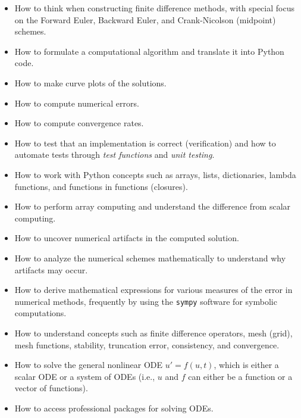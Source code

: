 \documentclass[graybox,sectrefs,envcountresetchap,open=right,final]{svmonodo}
\begin{document}
\begin{itemize}
 \item How to think when constructing finite difference methods, with special focus
   on the Forward Euler, Backward Euler, and Crank-Nicolson (midpoint)
   schemes.

 \item How to formulate a computational algorithm and translate it into
   Python code.

 \item How to make curve plots of the solutions.

 \item How to compute numerical errors.

 \item How to compute convergence rates.

 \item How to test that an implementation is correct (verification) and how
   to automate tests through \emph{test functions} and \emph{unit testing}.

 \item How to work with Python concepts such as arrays, lists, dictionaries,
   lambda functions, and functions in functions (closures).

 \item How to perform array computing and understand the difference from
   scalar computing.

 \item How to uncover numerical artifacts in the computed solution.

 \item How to analyze the numerical schemes mathematically to understand
   why artifacts may occur.

 \item How to derive mathematical expressions for various measures of
   the error in numerical methods, frequently by using the \texttt{sympy} software
   for symbolic computations.

 \item How to understand concepts such as finite difference operators,
   mesh (grid), mesh functions,
   stability, truncation error, consistency, and convergence.

 \item How to solve the general nonlinear ODE $u'=f(u,t)$,
   which is either a scalar ODE or a system of ODEs (i.e., $u$ and $f$
   can either be a function or a vector of functions).

 \item How to access professional packages for solving ODEs.


\end{itemize}
\end{document}
